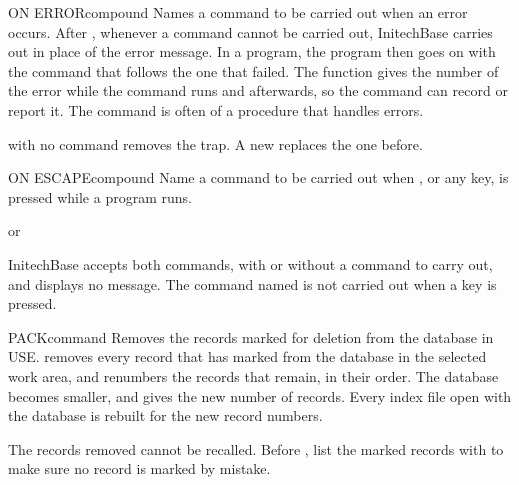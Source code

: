 \begin{XbaseEntry}{ON ERROR}{compound}
%
Names a command to be carried out when an error occurs.
\Syntax
{}
\Usage
After  , whenever a command cannot be carried out,
InitechBase carries out  in place of the error message.  In a
program, the program then goes on with the command that follows the one that
failed.  The function  gives the number of the error while the
command runs and afterwards, so the command can record or report it.  The
command is often  of a procedure that handles errors.

 with no command removes the trap.  A new  replaces
the one before.
\Examples
{}
\end{XbaseEntry}

\begin{XbaseEntry}{ON ESCAPE}{compound}
Name a command to be carried out when , or any key, is pressed while
a program runs.
\Syntax
{}
\par or\par
{}
\Usage
InitechBase accepts both commands, with or without a command to carry out,
and displays no message.  The command named is not carried out when a key is
pressed.
\end{XbaseEntry}

\begin{XbaseEntry}{PACK}{command}
Removes the records marked for deletion from the database in USE.
\Syntax
{}
\Usage
{} removes every record that  has marked from the database
in the selected work area, and renumbers the records that remain, in their
order.  The database becomes smaller, and  gives the new
number of records.  Every index file open with the database is rebuilt for the
new record numbers.

The records removed cannot be recalled.
\Tips
Before , list the marked records with  to make
sure no record is marked by mistake.
\Examples
{}
\end{XbaseEntry}


